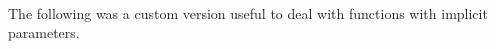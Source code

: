 \begin{code}
%
\>[6]\AgdaSpace{}%
\AgdaSymbol{:}\AgdaSpace{}%
\AgdaSymbol{(}\AgdaSpace{}%
\AgdaSymbol{)}\AgdaSpace{}%
\AgdaSpace{}%
\AgdaSymbol{(}\AgdaSpace{}%
\AgdaSymbol{)}\AgdaSpace{}%
\AgdaFunction{[}\AgdaSpace{}%
\AgdaSpace{}%
\AgdaFunction{/}\AgdaSpace{}%
\AgdaSpace{}%
\AgdaFunction{]}\<%
\\
%
\>[6]\AgdaSpace{}%
\AgdaSymbol{=}\AgdaSpace{}%
\AgdaSpace{}%
\AgdaSymbol{(}\AgdaSpace{}%
\AgdaSymbol{)}\AgdaSpace{}%
\AgdaSymbol{(}\AgdaSpace{}%
\AgdaSpace{}%
\AgdaSpace{}%
\AgdaSymbol{(}\AgdaSpace{}%
\AgdaSymbol{))}\AgdaSpace{}%
\AgdaSymbol{(}\AgdaSpace{}%
\AgdaSymbol{)}\<%
\end{code}  

\begin{code}%
%
\>[2]\<%
\\
\>[2][@{}l@{\AgdaIndent{0}}]%
\>[3]\<%
\\
\>[3][@{}l@{\AgdaIndent{0}}]%
\>[4]\AgdaSymbol{:}\AgdaSpace{}%
\AgdaSymbol{\{}\AgdaSpace{}%
\AgdaSymbol{:}\AgdaSpace{}%
\AgdaSpace{}%
\AgdaSymbol{\}\{}\AgdaSpace{}%
\AgdaSymbol{:}\AgdaSpace{}%
\AgdaSpace{}%
\AgdaSpace{}%
\AgdaSpace{}%
\AgdaSymbol{\}}\<%
\\
%
\>[4]\AgdaSpace{}%
\AgdaSymbol{(}\AgdaSpace{}%
\AgdaSymbol{:}\AgdaSpace{}%
\AgdaSpace{}%
\AgdaSymbol{)}\<%
\\
%
\>[4]\AgdaSpace{}%
\AgdaSymbol{((}\AgdaSpace{}%
\AgdaSymbol{:}\AgdaSpace{}%
\AgdaSymbol{)}\AgdaSpace{}%
\AgdaSpace{}%
\AgdaSpace{}%
\AgdaSymbol{(}\AgdaSpace{}%
\AgdaSymbol{))}\<%
\\
%
\>[4]\AgdaSpace{}%
\AgdaSpace{}%
\AgdaSymbol{(}\AgdaSpace{}%
\AgdaSpace{}%
\AgdaSymbol{)}\<%
\end{code}

The following was a custom version useful to deal with functions
with implicit parameters.

